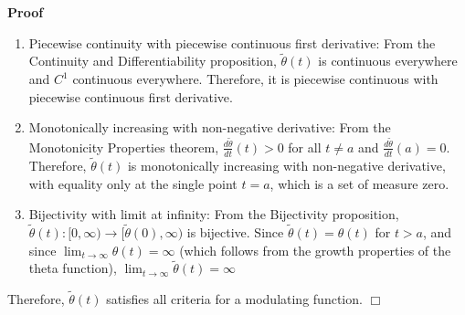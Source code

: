 \documentclass{article}
\newenvironment{proof}{\noindent\textbf{Proof\ }}{\hspace*{\fill}$\Box$\medskip}
\begin{document}
\begin{proof}
  \begin{enumerate}
    \item Piecewise continuity with piecewise continuous first derivative:
    From the Continuity and Differentiability proposition, $\tilde{\theta}
    (t)$ is continuous everywhere and $C^1$ continuous everywhere. Therefore,
    it is piecewise continuous with piecewise continuous first derivative.
    
    \item Monotonically increasing with non-negative derivative: From the
    Monotonicity Properties theorem, $\frac{d \tilde{\theta}}{dt} (t) > 0$ for
    all $t \neq a$ and $\frac{d \tilde{\theta}}{dt} (a) = 0$. Therefore,
    $\tilde{\theta} (t)$ is monotonically increasing with non-negative
    derivative, with equality only at the single point $t = a$, which is a set
    of measure zero.
    
    \item Bijectivity with limit at infinity: From the Bijectivity
    proposition, $\tilde{\theta} (t) : [0, \infty) \to [\tilde{\theta} (0),
    \infty)$ is bijective. Since $\tilde{\theta} (t) = \theta (t)$ for $t >
    a$, and since $\lim_{t \to \infty} \theta (t) = \infty$ (which follows
    from the growth properties of the theta function), $\lim_{t \to \infty} 
    \tilde{\theta} (t) = \infty$
  \end{enumerate}
  Therefore, $\tilde{\theta} (t)$ satisfies all criteria for a modulating
  function.
\end{proof}
\end{document}
